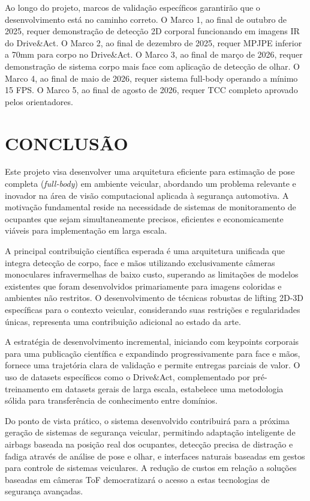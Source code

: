 \documentclass[12pt, a4paper]{article}
\begin{document}
Ao longo do projeto, marcos de validação específicos garantirão que o desenvolvimento está no caminho correto. O Marco 1, ao final de outubro de 2025, requer demonstração de detecção 2D corporal funcionando em imagens IR do Drive\&Act. O Marco 2, ao final de dezembro de 2025, requer MPJPE inferior a 70mm para corpo no Drive\&Act. O Marco 3, ao final de março de 2026, requer demonstração de sistema corpo mais face com aplicação de detecção de olhar. O Marco 4, ao final de maio de 2026, requer sistema full-body operando a mínimo 15 FPS. O Marco 5, ao final de agosto de 2026, requer TCC completo aprovado pelos orientadores.

\section{CONCLUSÃO}

Este projeto visa desenvolver uma arquitetura eficiente para estimação de pose completa (\textit{full-body}) em ambiente veicular, abordando um problema relevante e inovador na área de visão computacional aplicada à segurança automotiva. A motivação fundamental reside na necessidade de sistemas de monitoramento de ocupantes que sejam simultaneamente precisos, eficientes e economicamente viáveis para implementação em larga escala.

A principal contribuição científica esperada é uma arquitetura unificada que integra detecção de corpo, face e mãos utilizando exclusivamente câmeras monoculares infravermelhas de baixo custo, superando as limitações de modelos existentes que foram desenvolvidos primariamente para imagens coloridas e ambientes não restritos. O desenvolvimento de técnicas robustas de lifting 2D-3D específicas para o contexto veicular, considerando suas restrições e regularidades únicas, representa uma contribuição adicional ao estado da arte.

A estratégia de desenvolvimento incremental, iniciando com keypoints corporais para uma publicação científica e expandindo progressivamente para face e mãos, fornece uma trajetória clara de validação e permite entregas parciais de valor. O uso de datasets específicos como o Drive\&Act, complementado por pré-treinamento em datasets gerais de larga escala, estabelece uma metodologia sólida para transferência de conhecimento entre domínios.

Do ponto de vista prático, o sistema desenvolvido contribuirá para a próxima geração de sistemas de segurança veicular, permitindo adaptação inteligente de airbags baseada na posição real dos ocupantes, detecção precisa de distração e fadiga através de análise de pose e olhar, e interfaces naturais baseadas em gestos para controle de sistemas veiculares. A redução de custos em relação a soluções baseadas em câmeras ToF democratizará o acesso a estas tecnologias de segurança avançadas.
\end{document}
